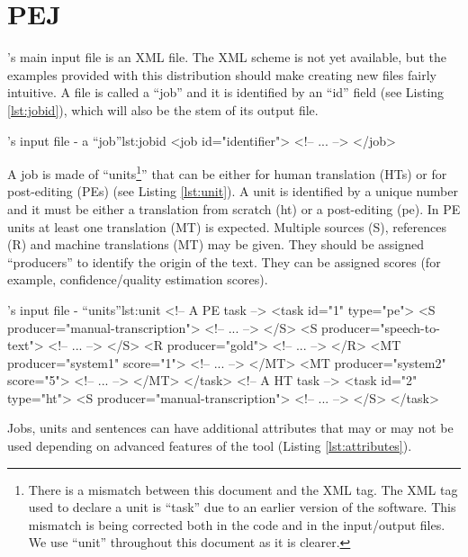 \section{PEJ}\label{sec:pej}

\PET's main input file is an XML file. The XML scheme is not yet available, but the examples provided with this distribution should make creating new files fairly intuitive.
A file is called a ``job'' and it is identified by an ``id'' field (see Listing \ref{lst:jobid}), which will also be the stem of its output file.

\begin{workflow-code}{\PET's input file - a ``job''}{lst:jobid}
<job id="identifier">
	<!-- ... -->
</job>
\end{workflow-code}

A job is made of ``units\footnote{There is a mismatch between this document and the XML tag. The XML tag used to declare a unit is ``task'' due to an earlier version of the software. This mismatch is being corrected both in the code and in the input/output files. We use ``unit'' throughout this document as it is clearer.}'' that can be either for human translation (HTs) or for post-editing (PEs) (see Listing \ref{lst:unit}).
A unit is identified by a unique number and it must be either a translation from scratch (ht) or a post-editing (pe). In PE units at least one translation (MT) is expected.
Multiple sources (S), references (R) and machine translations (MT) may be given. They should be assigned ``producers'' to identify the origin of the text. They can be assigned scores (for example, confidence/quality estimation scores).

\begin{workflow-code}{\PET's input file - ``units''}{lst:unit}
<!-- A PE task -->
<task id="1" type="pe"> 
	<S producer="manual-transcription"> 
		<!-- ... -->
	</S>
	<S producer="speech-to-text">
		<!-- ... -->
	</S>
	<R producer="gold">
		<!-- ... -->
	</R>
	<MT producer="system1" score="1">
		<!-- ... -->
	</MT>
	<MT producer="system2" score="5">
		<!-- ... -->
	</MT>
</task>
<!-- A HT task -->
<task id="2" type="ht"> 
	<S producer="manual-transcription"> 
		<!-- ... -->
	</S>
</task>
\end{workflow-code}

Jobs, units and sentences can have additional attributes that may or may not be used depending on advanced features of the tool (Listing \ref{lst:attributes}).

